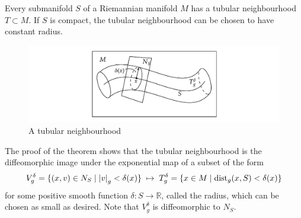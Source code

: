 \begin{thm} 
	Every submanifold $S$ of a Riemannian manifold $M$ has a 
	tubular neighbourhood  $T\subset M$. If $S$ is compact, the tubular
	neighbourhood can be chosen to have constant radius.
\end{thm}

\begin{figure}[htb]
	\centering
	\includegraphics[width=\textwidth]{figs/tubular_neighbourhood.pdf}
	\caption{A tubular neighbourhood}
	\label{fig:tubular_neighbourhood}
\end{figure}
The proof of the theorem shows that the tubular neighbourhood is the
diffeomorphic image under the exponential map of a subset of the form
\begin{equation} \label{eq:tubular_radius}
	V^\delta_g = \set[*]{(x,v)\in N_S \mid \abs{v}_g < \delta(x)}
	\;\mapsto\; 
	T^\delta_g = \set{x \in M \mid \operatorname{dist}_g(x,S) < \delta(x)}
\end{equation}
for some positive smooth function $\delta : S \to \mathbb{R}$, called the
radius, which can be chosen as small as desired. Note that $V^\delta_g$ is 
diffeomorphic to  $N_S$.

